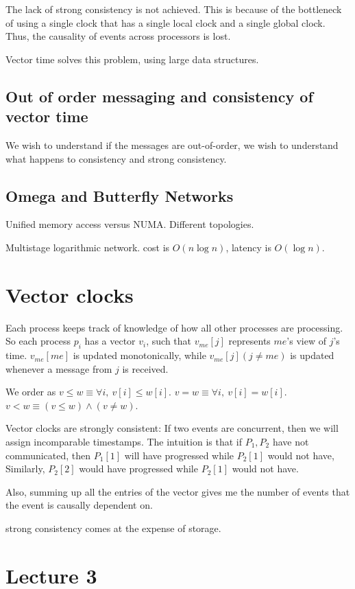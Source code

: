 \documentclass[11pt]{book}
\begin{document}
The lack of strong consistency is not achieved. This is because of the
bottleneck of using a single clock that has a single local clock and a single
global clock. Thus, the causality of events across processors is lost.

Vector time solves this problem, using large data structures.

\section{Out of order messaging and consistency of vector time}
We wish to understand if the messages are out-of-order, we wish to understand
what happens to consistency and strong consistency.

\section{Omega and Butterfly Networks}
Unified memory access versus NUMA. Different topologies. 

Multistage logarithmic network. cost is $O(n \log n)$, latency is $O(\log n)$.

\chapter{Vector clocks}

Each process keeps track of knowledge of how all other processes are processing.
So each process $p_i$ has a vector $v_i$, such that $v_{me}[j]$ represents $me$'s
view of $j$'s time. $v_{me}[me]$ is updated monotonically, while $v_{me}[j] (j \neq me)$ is
updated whenever a message from $j$ is received.

We order as $v \leq w \equiv \forall i, ~v[i] \leq w[i]$. $v = w \equiv \forall i, ~v[i] = w[i]$.
$v < w \equiv (v \leq w) \land (v \neq w)$.

Vector clocks are strongly consistent: If two events are concurrent, then we
will assign incomparable timestamps. The intuition is that if $P_1, P_2$
have not communicated, then $P_1[1]$ will have progressed while $P_2[1]$
would not have, Similarly, $P_2[2]$ would have progressed while $P_2[1]$
would not have.

Also, summing up all the entries of the vector gives me the number of
events that the event is causally dependent on.

strong consistency comes at the expense of storage.

\chapter{Lecture 3}
\end{document}
